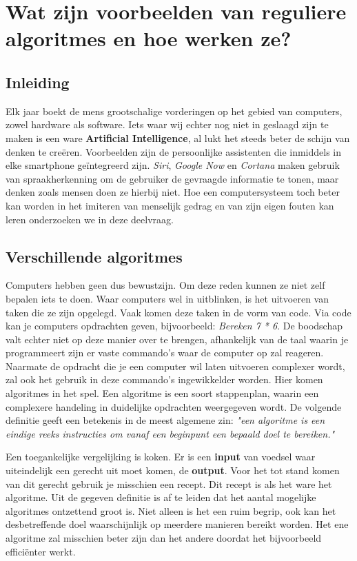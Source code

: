 
\section{Wat zijn voorbeelden van reguliere algoritmes en hoe werken ze?}

\subsection{Inleiding}
Elk jaar boekt de mens grootschalige vorderingen op het gebied van computers, zowel hardware als software. Iets waar wij echter nog niet in geslaagd zijn te maken is een ware \textbf{ Artificial Intelligence}, al lukt het steeds beter de schijn van denken te cre\"eren. Voorbeelden zijn de persoonlijke assistenten die inmiddels in elke smartphone geïntegreerd zijn. \textit{Siri}, \textit{Google Now} en \textit{Cortana} maken gebruik van spraakherkenning om de gebruiker de gevraagde informatie te tonen, maar denken zoals mensen doen ze hierbij niet. Hoe een computersysteem toch beter kan worden in het imiteren van menselijk gedrag en van zijn eigen fouten kan leren onderzoeken we in deze deelvraag.


\subsection{Verschillende algoritmes}
Computers hebben geen dus bewustzijn. Om deze reden kunnen ze niet zelf bepalen iets te doen. Waar computers wel in uitblinken, is het uitvoeren van taken die ze zijn opgelegd. Vaak komen deze taken in de vorm van code. Via code kan je computers opdrachten geven, bijvoorbeeld: \textit{Bereken 7 * 6}. De boodschap valt echter niet op deze manier over te brengen, afhankelijk van de taal waarin je programmeert zijn er vaste commando's waar de computer op zal reageren.
Naarmate de opdracht die je een computer wil laten uitvoeren complexer wordt, zal ook het gebruik in deze commando's ingewikkelder worden. Hier komen algoritmes in het spel. Een algoritme is een soort stappenplan, waarin een complexere handeling in duidelijke opdrachten weergegeven wordt. De volgende definitie geeft een betekenis in de meest algemene zin: \textit{"een algoritme is een eindige reeks instructies om vanaf een beginpunt een bepaald doel te bereiken."} \cite{WoordenOrg}

Een toegankelijke vergelijking is koken. Er is een \textbf{input} van voedsel waar uiteindelijk een gerecht uit moet komen, de \textbf{output}. Voor het tot stand komen van dit gerecht gebruik je misschien een recept. Dit recept is als het ware het algoritme.
Uit de gegeven definitie is af te leiden dat het aantal mogelijke algoritmes ontzettend groot is. Niet alleen is het een ruim begrip, ook kan het desbetreffende doel waarschijnlijk op meerdere manieren bereikt worden. Het ene algoritme zal misschien beter zijn dan het andere doordat het bijvoorbeeld effici\"enter werkt.

